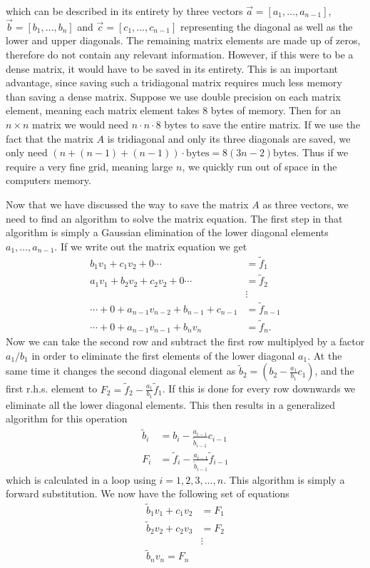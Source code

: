\documentclass[twocolumn]{aastex62}
\begin{document}
which can be described in its entirety by three vectors $\vec{a} = [a_1,\ldots, a_{n-1}]$, $\vec{b} = [b_1,\ldots,b_n]$ and $\vec{c} = [c_1,\ldots,c_{n-1}]$ representing the diagonal as well as the lower and upper diagonals. The remaining matrix elements are made up of zeros, therefore do not contain any relevant information. However, if this were to be a dense matrix, it would have to be saved in its entirety. This is an important advantage, since saving such a tridiagonal matrix requires much less memory than saving a dense matrix. Suppose we use double precision on each matrix element, meaning each matrix element takes 8 bytes of memory. Then for an $n\times n$ matrix we would need $n\cdot n\cdot 8$ bytes to save the entire matrix. If we use the fact that the matrix $A$ is tridiagonal and only its three diagonals are saved, we only need $\left(n + (n-1) + (n-1)\right) \cdot \text{bytes} = 8(3n - 2) \text{bytes}$. Thus if we require a very fine grid, meaning large $n$, we quickly run out of space in the computers memory. 

Now that we have discussed the way to save the matrix $A$ as three vectors, we need to find an algorithm to solve the matrix equation. The first step in that algorithm is simply a Gaussian elimination of the lower diagonal elements $a_1,\ldots, a_{n-1}$. If we write out the matrix equation we get 
\begin{align}
	b_1 v_1 + c_1v_2 + 0  \cdots &= \tilde{f}_1\\
	a_1 v_1 + b_2 v_2 + c_2 v_2 + 0 \cdots &= \tilde{f}_2\\
	&\vdots\\
	\cdots+0+a_{n-1} v_{n-2} + b_{n-1} + c_{n-1} &= \tilde{f}_{n-1}\\
	\cdots+0+a_{n-1}v_{n-1} + b_{n} v_{n} &= \tilde{f}_n.
\end{align}
Now we can take the second row and subtract the first row multiplyed by a factor $a_1/b_1$ in order to eliminate the first elements of the lower diagonal $a_1$. At the same time it changes the second diagonal element as $\tilde{b}_2 = (b_2 - \frac{a_1}{b_1}c_1)$, and the first r.h.s. element to $F_2 = \tilde{f}_2 - \frac{a_1}{b_1}\tilde{f}_1$. If this is done for every row downwards we eliminate all the lower diagonal elements. This then results in a generalized algorithm for this operation
\begin{align}
	\tilde{b}_i &= b_i - \frac{a_{i-1}}{\tilde{b}_{i-1}}c_{i-1}
	\label{eq:first_forward}\\
	F_i & = \tilde{f}_i - \frac{a_{i-1}}{\tilde{b}_{i-1}}\tilde{f}_{i - 1}\label{eq:second_forward}
\end{align}
which is calculated in a loop using $i=1,2,3,\ldots, n$. This algorithm is simply a forward substitution. We now have the following set of equations
\begin{align}
	\tilde{b}_1v_1 + c_1v_2  &= F_1\\
	\tilde{b}_2v_2 + c_2v_3 &= F_2\\
	&\vdots\\
	\tilde{b}_nv_n = F_n
	\label{eq:backward}	
\end{align}
\end{document}
